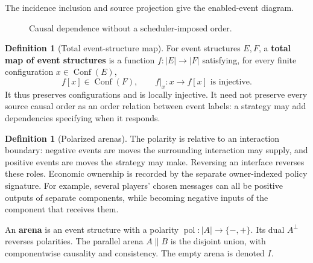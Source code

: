 \documentclass[11pt,a4paper]{article}
\numberwithin{equation}{section}
\theoremstyle{definition}
\newtheorem{definition}[theorem]{Definition}
\theoremstyle{remark}
\theoremstyle{plain}
\begin{document}
\noindent The incidence inclusion and source projection give the enabled-event diagram.
\begin{center}
\end{center}

\begin{figure}[htbp]
\centering
{}
\caption{Causal dependence without a scheduler-imposed order.}
\label{fig:egt-concurrency}
\end{figure}

\begin{definition}[Total event-structure map]
\label{def:egt-total-event-structure-map}
For event structures $E,F$, a \textbf{total map of event structures} is a
function $f:|E|\to|F|$ satisfying, for every finite configuration
$x\in\operatorname{Conf}(E)$,
\[
 f[x]\in\operatorname{Conf}(F),\qquad
 f|_x:x\longrightarrow f[x]\text{ is injective}.
\]
It thus preserves configurations and is locally injective. It need not
preserve every source causal order as an order relation between event
labels: a strategy may add dependencies specifying when it responds.
\end{definition}
\begin{definition}[Polarized arenas]
\label{def:egt-polarized-arenas}
The polarity is relative to an interaction boundary: negative events are
moves the surrounding interaction may supply, and positive events are moves
the strategy may make. Reversing an interface reverses these roles. Economic ownership is recorded by the separate owner-indexed policy signature. For example,
several players' chosen messages can all be positive outputs of separate
components, while becoming negative inputs of the component that receives
them.

An \textbf{arena} is an event structure with a polarity
$\operatorname{pol}:|A|\to\{-,+\}$. Its dual $A^\perp$ reverses polarities.
The parallel arena $A\parallel B$ is the disjoint union, with componentwise
causality and consistency. The empty arena is denoted $I$.
\end{definition}
\end{document}
